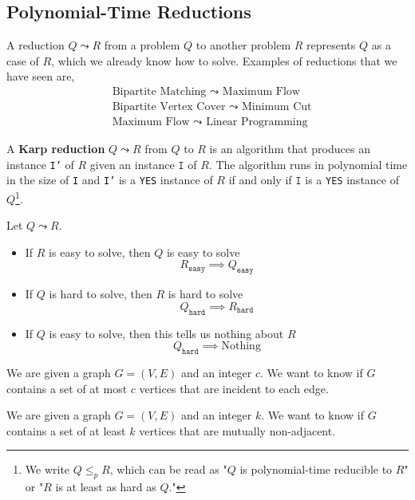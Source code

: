 
	\subsection{Polynomial-Time Reductions}
	A reduction $Q \leadsto R$ from a problem $Q$ to another problem $R$ represents $Q$ as a case of $R$, which we already know how to solve. Examples of reductions that we have seen are,
	\begin{align*}
		&\text{Bipartite Matching $\leadsto$ Maximum Flow} \\
		&\text{Bipartite Vertex Cover $\leadsto$ Minimum Cut} \\
		&\text{Maximum Flow $\leadsto$ Linear Programming}
	\end{align*}

	\begin{defn}
		A \textbf{Karp reduction} $Q \leadsto R$ from $Q$ to $R$ is an algorithm that produces an instance \texttt{I'} of $R$ given an instance $\texttt{I}$ of $R$. The algorithm runs in polynomial time in the size of \texttt{I} and \texttt{I'} is a \texttt{YES} instance of $R$ if and only if $\texttt{I}$ is a \texttt{YES} instance of $Q$\footnote{We write $Q \leq_p R$, which can be read as "$Q$ is polynomial-time reducible to $R$" or "$R$ is at least as hard as $Q$."}.
	\end{defn}

	\begin{rmk}
		Let $Q \leadsto R$. 
		\begin{itemize}
			\item If $R$ is easy to solve, then $Q$ is easy to solve
			\[R_{\texttt{easy}} \implies Q_{\texttt{easy}}\]
			\item If $Q$ is hard to solve, then $R$ is hard to solve
			\[Q_{\texttt{hard}} \implies R_{\texttt{hard}}\]
			\item If $Q$ is easy to solve, then this tells us nothing about $R$ 
			\[Q_{\texttt{hard}} \implies \text{Nothing}\]
		\end{itemize}
	\end{rmk}

	\begin{defn}
		We are given a graph $G = (V, E)$ and an integer $c$. We want to know if $G$ contains a set of at most $c$ vertices that are incident to each edge.
	\end{defn}

	\begin{defn}
		We are given a graph $G = (V, E)$ and an integer $k$. We want to know if $G$ contains a set of at least $k$ vertices that are mutually non-adjacent.
	\end{defn}

